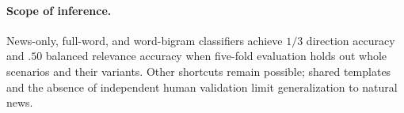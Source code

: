 \paragraph{Scope of inference.}
News-only, full-word, and word-bigram classifiers achieve $1/3$ direction
accuracy and $.50$ balanced relevance accuracy when five-fold evaluation holds
out whole scenarios and their variants. Other shortcuts remain possible; shared
templates and the absence of independent human validation limit generalization
to natural news.
